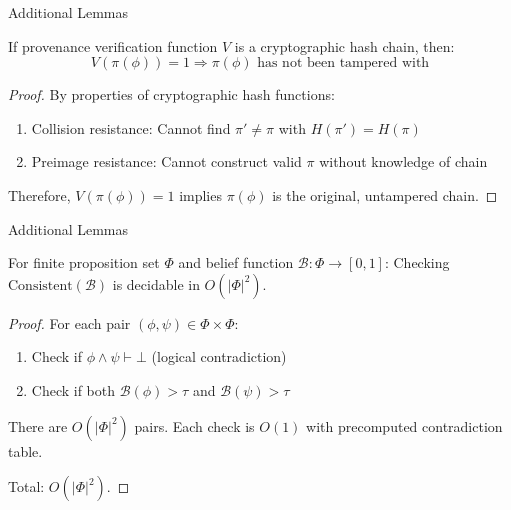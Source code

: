 \documentclass[
  ignorenonframetext,
]{beamer}
\begin{document}
\begin{frame}[allowframebreaks]{Additional Lemmas}
\begin{lemma}
\label{lem:provenance-chain}
If provenance verification function $V$ is a cryptographic hash chain, then:
\begin{equation}
\label{eq:provenance-chain}
V(\pi(\phi)) = 1 \Rightarrow \pi(\phi) \text{ has not been tampered with}
\end{equation}
\end{lemma}

\begin{proof}
By properties of cryptographic hash functions:
\begin{enumerate}
\item Collision resistance: Cannot find $\pi' \neq \pi$ with $H(\pi') = H(\pi)$
\item Preimage resistance: Cannot construct valid $\pi$ without knowledge of chain
\end{enumerate}

Therefore, $V(\pi(\phi)) = 1$ implies $\pi(\phi)$ is the original, untampered chain.
\end{proof}

\end{frame}

\begin{frame}[allowframebreaks]{Additional Lemmas}
\begin{lemma}
\label{lem:consistency-decidable}
For finite proposition set $\Phi$ and belief function $\mathcal{B}: \Phi \to [0,1]$:
Checking $\text{Consistent}(\mathcal{B})$ is decidable in $O(|\Phi|^2)$.
\end{lemma}

\begin{proof}
For each pair $(\phi, \psi) \in \Phi \times \Phi$:
\begin{enumerate}
\item Check if $\phi \land \psi \vdash \bot$ (logical contradiction)
\item Check if both $\mathcal{B}(\phi) > \tau$ and $\mathcal{B}(\psi) > \tau$
\end{enumerate}

There are $O(|\Phi|^2)$ pairs. Each check is $O(1)$ with precomputed contradiction table.

Total: $O(|\Phi|^2)$.
\end{proof}

\end{frame}
\end{document}
